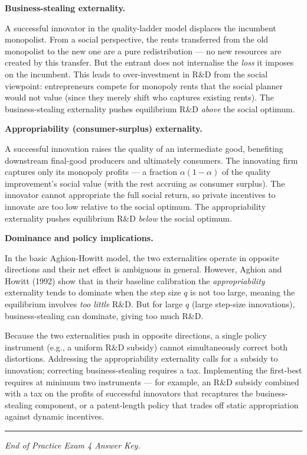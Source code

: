 \documentclass[a4paper,11pt]{article}
\begin{document}
\begin{answerbox}
\textbf{Business-stealing externality.}

A successful innovator in the quality-ladder model displaces the incumbent monopolist.  From a social perspective, the rents transferred from the old monopolist to the new one are a pure redistribution --- no new resources are created by this transfer.  But the entrant does not internalise the \emph{loss} it imposes on the incumbent.  This leads to over-investment in R\&D from the social viewpoint: entrepreneurs compete for monopoly rents that the social planner would not value (since they merely shift who captures existing rents).  The business-stealing externality pushes equilibrium R\&D \emph{above} the social optimum.

\textbf{Appropriability (consumer-surplus) externality.}

A successful innovation raises the quality of an intermediate good, benefiting downstream final-good producers and ultimately consumers.  The innovating firm captures only its monopoly profits --- a fraction $\alpha(1-\alpha)$ of the quality improvement's social value (with the rest accruing as consumer surplus).  The innovator cannot appropriate the full social return, so private incentives to innovate are too low relative to the social optimum.  The appropriability externality pushes equilibrium R\&D \emph{below} the social optimum.

\textbf{Dominance and policy implications.}

In the basic Aghion-Howitt model, the two externalities operate in opposite directions and their net effect is ambiguous in general.  However, Aghion and Howitt (1992) show that in their baseline calibration the \emph{appropriability} externality tends to dominate when the step size $q$ is not too large, meaning the equilibrium involves \emph{too little} R\&D.  But for large $q$ (large step-size innovations), business-stealing can dominate, giving too much R\&D.

Because the two externalities push in opposite directions, a single policy instrument (e.g., a uniform R\&D subsidy) cannot simultaneously correct both distortions.  Addressing the appropriability externality calls for a subsidy to innovation; correcting business-stealing requires a tax.  Implementing the first-best requires at minimum two instruments --- for example, an R\&D subsidy combined with a tax on the profits of successful innovators that recaptures the business-stealing component, or a patent-length policy that trades off static appropriation against dynamic incentives.
\end{answerbox}

\vspace{20pt}
\noindent\rule{\textwidth}{0.4pt}

\begin{center}
    \textit{End of Practice Exam 4 Answer Key.}
\end{center}
\end{document}
